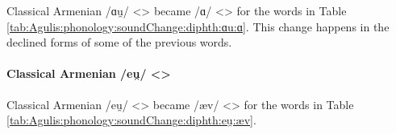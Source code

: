 \begin{adjarianpage}\label{page:95}\end{adjarianpage}%


Classical Armenian /ɑu̯/ <> became /ɑ/ <> for the words in Table \ref{tab:Agulis:phonology:soundChange:diphth:ɑu:ɑ}. This change happens in the declined forms of some of the previous words.

\begin{table}[H]
	\centering
	\caption{Change from Classical Armenian /ɑu̯/ <> to /ɑ/ <> in the Agulis dialect}
	\label{tab:Agulis:phonology:soundChange:diphth:ɑu:ɑ}
	\end{table}


\paragraph{Classical Armenian /eu̯/ <>}

Classical Armenian /eu̯/ <> became /æv/ <> for the words in Table \ref{tab:Agulis:phonology:soundChange:diphth:eu̯:æv}. 


\begin{table}[H]
	\centering
	\caption{Change from Classical Armenian /eu̯/ <> to /æv/ <> in the Agulis dialect}
	\label{tab:Agulis:phonology:soundChange:diphth:eu̯:æv}
	\end{table}

